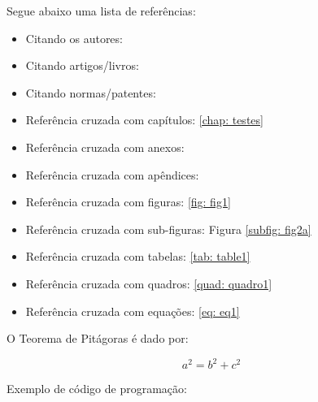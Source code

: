 Segue abaixo uma lista de referências:

\begin{itemize}%
  \item Citando os autores: 
  \item Citando artigos/livros: \cite{Ciresan2012,SMIRNOV201489}
  \item Citando normas/patentes: \cite{NBR6023:2000,EHLINGER:2006:biblatex}
  \item Referência cruzada com capítulos: \autoref{chap: testes}
  \item Referência cruzada com anexos: 
  \item Referência cruzada com apêndices: 
  \item Referência cruzada com figuras: \autoref{fig: fig1}
  \item Referência cruzada com sub-figuras: Figura \ref{subfig: fig2a}
  \item Referência cruzada com tabelas: \autoref{tab: table1}
  \item Referência cruzada com quadros: \autoref{quad: quadro1}
  \item Referência cruzada com equações: \autoref{eq: eq1}
\end{itemize}
    

O Teorema de Pitágoras é dado por:

\begin{equation}
    \label{eq: eq1}
	a^{2}= b^{2}+c^{2}
\end{equation}

Exemplo de código de programação:
  
